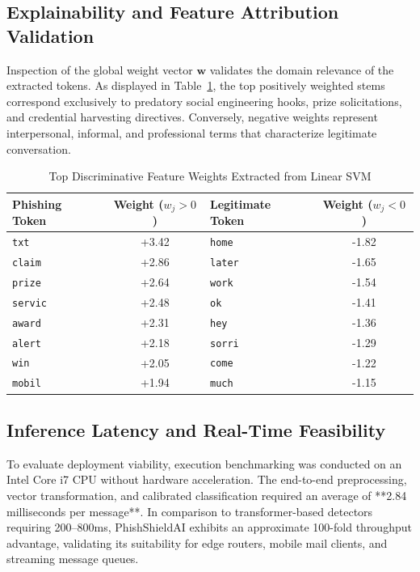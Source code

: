 \documentclass[conference]{IEEEtran}
\begin{document}
\subsection{Explainability and Feature Attribution Validation}
Inspection of the global weight vector $\mathbf{w}$ validates the domain relevance of the extracted tokens. As displayed in Table~\ref{tab:features}, the top positively weighted stems correspond exclusively to predatory social engineering hooks, prize solicitations, and credential harvesting directives. Conversely, negative weights represent interpersonal, informal, and professional terms that characterize legitimate conversation.

\begin{table}[htbp]
\caption{Top Discriminative Feature Weights Extracted from Linear SVM}
\begin{center}
\begin{tabular}{lc|lc}
\toprule
\textbf{Phishing Token} & \textbf{Weight ($w_j > 0$)} & \textbf{Legitimate Token} & \textbf{Weight ($w_j < 0$)} \\
\midrule
\texttt{txt} & +3.42 & \texttt{home} & -1.82 \\
\texttt{claim} & +2.86 & \texttt{later} & -1.65 \\
\texttt{prize} & +2.64 & \texttt{work} & -1.54 \\
\texttt{servic} & +2.48 & \texttt{ok} & -1.41 \\
\texttt{award} & +2.31 & \texttt{hey} & -1.36 \\
\texttt{alert} & +2.18 & \texttt{sorri} & -1.29 \\
\texttt{win} & +2.05 & \texttt{come} & -1.22 \\
\texttt{mobil} & +1.94 & \texttt{much} & -1.15 \\
\bottomrule
\end{tabular}
\label{tab:features}
\end{center}
\end{table}

\subsection{Inference Latency and Real-Time Feasibility}
To evaluate deployment viability, execution benchmarking was conducted on an Intel Core i7 CPU without hardware acceleration. The end-to-end preprocessing, vector transformation, and calibrated classification required an average of **2.84 milliseconds per message**. In comparison to transformer-based detectors requiring 200–800ms, PhishShieldAI exhibits an approximate 100-fold throughput advantage, validating its suitability for edge routers, mobile mail clients, and streaming message queues.
\end{document}
